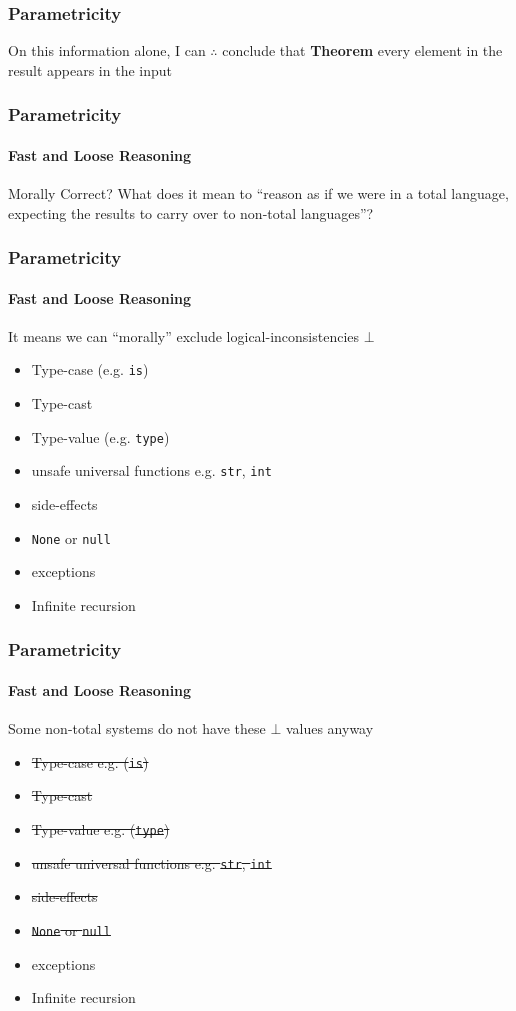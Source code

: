 \begin{frame}
\frametitle{Parametricity}
\begin{block}{On this information alone, I can $\therefore$ conclude that}
\textbf{Theorem} every element in the result appears in the input
\end{block}
\end{frame}


\begin{frame}
\frametitle{Parametricity}
\framesubtitle{Fast and Loose Reasoning}
\begin{block}{Morally Correct?}
What does it mean to ``reason as if we were in a total language, expecting the results to carry over to non-total languages''?
\end{block}
\end{frame}


\begin{frame}
\frametitle{Parametricity}
\framesubtitle{Fast and Loose Reasoning}
\begin{block}{It means we can ``morally'' exclude logical-inconsistencies $\bot$}
\begin{itemize}
  \item Type-case (e.g. \lstinline{is})
  \item Type-cast
  \item Type-value (e.g. \lstinline{type})
  \item unsafe universal functions e.g. \lstinline{str}, \lstinline{int}
  \item side-effects
  \item \lstinline{None} or \lstinline{null}
  \item exceptions
  \item Infinite recursion
\end{itemize}
\end{block}
\end{frame}


\begin{frame}
\frametitle{Parametricity}
\framesubtitle{Fast and Loose Reasoning}
\begin{block}{Some non-total systems do not have these $\bot$ values anyway}
\begin{itemize}
  \item \sout{Type-case e.g. (\lstinline{is})}
  \item \sout{Type-cast}
  \item \sout{Type-value e.g. (\lstinline{type})}
  \item \sout{unsafe universal functions e.g. \lstinline{str}, \lstinline{int}}
  \item \sout{side-effects}
  \item \sout{\lstinline{None} or \lstinline{null}}
  \item exceptions
  \item Infinite recursion
\end{itemize}
\end{block}
\end{frame}


